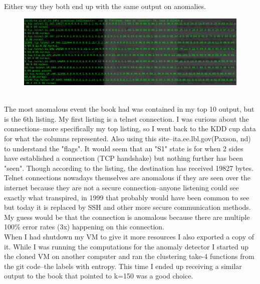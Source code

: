 \documentclass[10pt]{article}
\begin{document}
\indent Either way they both end up with the same output on anomalies.
\begin{figure}[!h]
\includegraphics[scale=0.37]{finalOutput.png}
\centering
\end{figure}\\
\indent The most anomalous event the book had was contained in my top 10 output, but is the 6th listing. My first listing is a telnet connection. I was curious about the connections--more specifically my top listing, so I went back to the KDD cup data for what the columns represented. Also using this site--ita.ee.lbl.gov(Paxson, nd) to understand the "flags". It would seem that an "S1" state is for when 2 sides have established a connection (TCP handshake) but nothing further has been "seen". Though according to the listing, the destination has received 19827 bytes. Telnet connections nowadays themselves are anomalous if they are seen over the internet because they are not a secure connection--anyone listening could see exactly what transpired, in 1999 that probably would have been common to see but today it is replaced by SSH and other more secure communication methods. My guess would be that the connection is anomalous because there are multiple 100\% error rates (3x) happening on this connection.\\
\indent When I had shutdown my VM to give it more resources I also exported a copy of it. While I was running the computations for the anomaly detector I started up the cloned VM on another computer and ran the clustering take-4 functions from the git code--the labels with entropy. This time I ended up receiving a similar output to the book that pointed to k=150 was a good choice.
\par
{}%
\hfill
{}%
\par
\end{document}
